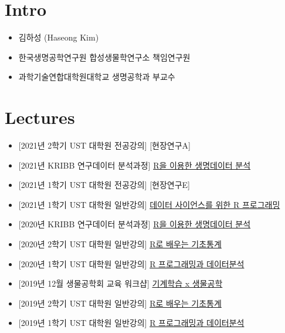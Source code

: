 \documentclass[
]{book}
\author{}
\date{\vspace{-2.5em}}
\providecommand{\tightlist}{%
  \setlength{\itemsep}{0pt}\setlength{\parskip}{0pt}}
\begin{document}
\frontmatter

\mainmatter
\hypertarget{intro}{%
\chapter{Intro}\label{intro}}

\begin{itemize}
\tightlist
\item
  김하성 (Haseong Kim)
\item
  한국생명공학연구원 합성생물학연구소 책임연구원
\item
  과학기술연합대학원대학교 생명공학과 부교수
\end{itemize}

\hypertarget{lectures}{%
\chapter{Lectures}\label{lectures}}

\begin{itemize}
\tightlist
\item
  {[}2021년 2학기 UST 대학원 전공강의{]} {[}현장연구A{]}
\item
  {[}2021년 KRIBB 연구데이터 분석과정{]}
  \href{https://greendaygh.github.io/kribbr2021/}{R을 이용한 생명데이터
  분석}
\item
  {[}2021년 1학기 UST 대학원 전공강의{]} {[}현장연구E{]}
\item
  {[}2021년 1학기 UST 대학원 일반강의{]}
  \href{https://greendaygh.github.io/Rprog2021/}{데이터 사이언스를 위한
  R 프로그래밍}
\item
  {[}2020년 KRIBB 연구데이터 분석과정{]}
  \href{https://greendaygh.github.io/KRIBBR2020/}{R을 이용한 생명데이터
  분석}
\item
  {[}2020년 2학기 UST 대학원 일반강의{]}
  \href{https://greendaygh.github.io/Rstat2020/}{R로 배우는 기초통계}
\item
  {[}2020년 1학기 UST 대학원 일반강의{]}
  \href{https://greendaygh.github.io/Rprog2020/}{R 프로그래밍과
  데이터분석}
\item
  {[}2019년 12월 생물공학회 교육 워크샵{]}
  \href{https://github.com/greendaygh/bioengml}{기계학습 x 생물공학}
\item
  {[}2019년 2학기 UST 대학원 일반강의{]}
  \href{https://greendaygh.github.io/Rstat2019/}{R로 배우는 기초통계}
\item
  {[}2019년 1학기 UST 대학원 일반강의{]}
  \href{https://greendaygh.github.io/Rprog2019/}{R 프로그래밍과
  데이터분석}
\end{itemize}
\end{document}
